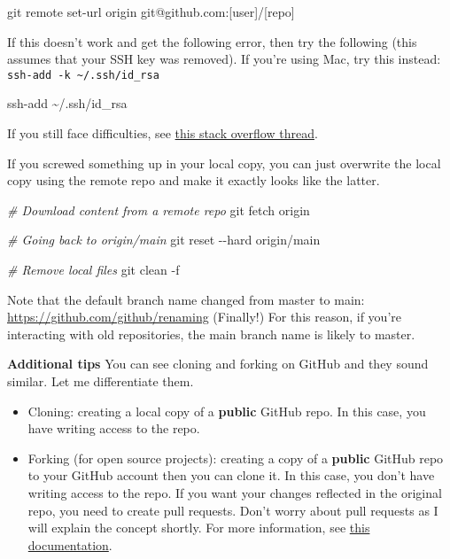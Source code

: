 \documentclass[
]{book}
\newenvironment{Shaded}{\begin{snugshade}}{\end{snugshade}}
\newcommand{\AttributeTok}[1]{\textcolor[rgb]{0.77,0.63,0.00}{#1}}
\newcommand{\CommentTok}[1]{\textcolor[rgb]{0.56,0.35,0.01}{\textit{#1}}}
\newcommand{\FunctionTok}[1]{\textcolor[rgb]{0.00,0.00,0.00}{#1}}
\newcommand{\NormalTok}[1]{#1}
\begin{document}
\begin{Shaded}
\begin{Highlighting}[]
\FunctionTok{git}\NormalTok{ remote set{-}url origin git@github.com:[user]/[repo]}
\end{Highlighting}
\end{Shaded}

If this doesn't work and get the following error, then try the following (this assumes that your SSH key was removed). If you're using Mac, try this instead: \texttt{ssh-add\ -k\ \textasciitilde{}/.ssh/id\_rsa}

\begin{Shaded}
\begin{Highlighting}[]
\FunctionTok{ssh{-}add}\NormalTok{ \textasciitilde{}/.ssh/id\_rsa}
\end{Highlighting}
\end{Shaded}

If you still face difficulties, see \href{https://stackoverflow.com/questions/13509293/git-fatal-could-not-read-from-remote-repository}{this stack overflow thread}.

If you screwed something up in your local copy, you can just overwrite the local copy using the remote repo and make it exactly looks like the latter.

\begin{Shaded}
\begin{Highlighting}[]
\CommentTok{\# Download content from a remote repo }
\FunctionTok{git}\NormalTok{ fetch origin}

\CommentTok{\# Going back to origin/main}
\FunctionTok{git}\NormalTok{ reset }\AttributeTok{{-}{-}hard}\NormalTok{ origin/main }

\CommentTok{\# Remove local files }
\FunctionTok{git}\NormalTok{ clean }\AttributeTok{{-}f}
\end{Highlighting}
\end{Shaded}

Note that the default branch name changed from master to main: \url{https://github.com/github/renaming} (Finally!) For this reason, if you're interacting with old repositories, the main branch name is likely to master.

\textbf{Additional tips}
You can see cloning and forking on GitHub and they sound similar. Let me differentiate them.

\begin{itemize}
\item
  Cloning: creating a local copy of a \textbf{public} GitHub repo. In this case, you have writing access to the repo.
\item
  Forking (for open source projects): creating a copy of a \textbf{public} GitHub repo to your GitHub account then you can clone it. In this case, you don't have writing access to the repo. If you want your changes reflected in the original repo, you need to create pull requests. Don't worry about pull requests as I will explain the concept shortly. For more information, see \href{https://docs.github.com/en/desktop/contributing-and-collaborating-using-github-desktop/cloning-and-forking-repositories-from-github-desktop}{this documentation}.
\end{itemize}
\end{document}
